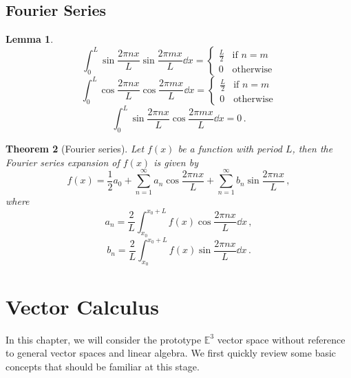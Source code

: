 \documentclass{article}
\theoremstyle{plain}\theoremheaderfont{\normalfont\itshape}\theorembodyfont{\rmfamily}\theoremseparator{.}\newtheorem*{rem}{Remark}\newtheorem*{ex}{Example}\newtheorem*{proof}{Proof}\newtheorem*{altp}{Alternative proof}
\theoremstyle{plain}\theoremheaderfont{\normalfont\bfseries}\theorembodyfont{\rmfamily}\theoremseparator{.}\newtheorem{thm}{Theorem}[section]\newtheorem{lem}[thm]{Lemma}\newtheorem{prop}[thm]{Proposition}\newtheorem*{cor}{Corollary}\newtheorem{defn}[thm]{Definition}\newtheorem{clm}[thm]{Claim}\newtheorem{clminproof}{Claim}
\theoremstyle{break}\theoremheaderfont{\normalfont\itshape}\theorembodyfont{\rmfamily}\theoremseparator{.\medskip}\newtheorem*{proofskip}{Proof}\newtheorem*{exs}{Examples}\newtheorem*{rems}{Remarks}
\theoremstyle{break}\theoremheaderfont{\normalfont\bfseries}\theorembodyfont{\rmfamily}\theoremseparator{.\medskip}\newtheorem{lemskip}[thm]{Lemma}\newtheorem{defnskip}[thm]{Definition}\newtheorem{propskip}[thm]{Proposition}\newtheorem{thmskip}[thm]{Theorem}
\numberwithin{equation}{section}
\begin{document}
	\subsection{Fourier Series}
	\begin{lem}
		\[\int_{0}^{L}\sin\frac{2\pi nx}{L}\sin\frac{2\pi mx}{L}\dd{x}=\begin{cases}
			\frac{L}{2} & \text{if }n=m\\
			0 & \text{otherwise}
		\end{cases}\]
		\[\int_{0}^{L}\cos\frac{2\pi nx}{L}\cos\frac{2\pi mx}{L}\dd{x}=\begin{cases}
			\frac{L}{2} & \text{if }n=m\\
			0 & \text{otherwise}
		\end{cases}\]
		\[\int_{0}^{L}\sin\frac{2\pi nx}{L}\cos\frac{2\pi mx}{L}\dd{x}=0\,.\]
	\end{lem}
	\begin{thm}[Fourier series]
		Let \(f(x)\) be a function with period \(L\), then the
		Fourier series expansion of \(f(x)\) is given by
		\[f(x)=\frac{1}{2}a_0+\sum_{n=1}^{\infty}a_n\cos\frac{2\pi nx}{L}+\sum_{n=1}^{\infty}b_n\sin\frac{2\pi nx}{L}\,,\]
		where
		\[a_n=\frac{2}{L}\int_{x_0}^{x_0+L}f(x)\cos\frac{2\pi nx}{L}\dd{x}\,,\]
		\[b_n=\frac{2}{L}\int_{x_0}^{x_0+L}f(x)\sin\frac{2\pi nx}{L}\dd{x}\,.\]
	\end{thm}
	\newpage
	\section{Vector Calculus}
	In this chapter, we will consider the prototype \(\mathbb{E}^3\) vector space without reference to general vector spaces and linear algebra. We first quickly review some basic concepts that should be familiar at this stage.
\end{document}
